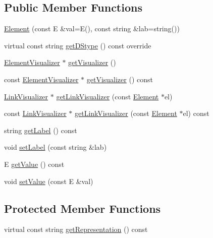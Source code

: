 \subsection*{Public Member Functions}
\begin{DoxyCompactItemize}
\item 
\hyperlink{classbridges_1_1_element_abc7131584142ea48faf3b7a8033d1fef}{Element} (const E \&val=E(), const string \&lab=string())
\item 
virtual const string \hyperlink{classbridges_1_1_element_a9e71af13963e8cc7ec35053797e49155}{get\+D\+Stype} () const  override
\item 
\hyperlink{classbridges_1_1_element_visualizer}{Element\+Visualizer} $\ast$ \hyperlink{classbridges_1_1_element_a358f350ae6e33d55c4ac9f9213d0c5bc}{get\+Visualizer} ()
\item 
const \hyperlink{classbridges_1_1_element_visualizer}{Element\+Visualizer} $\ast$ \hyperlink{classbridges_1_1_element_a7672ce8623ab561d457b4a91e19c4e53}{get\+Visualizer} () const 
\item 
\hyperlink{classbridges_1_1_link_visualizer}{Link\+Visualizer} $\ast$ \hyperlink{classbridges_1_1_element_aa8dd91d04c22c697f7c500a18642282f}{get\+Link\+Visualizer} (const \hyperlink{classbridges_1_1_element}{Element} $\ast$el)
\item 
const \hyperlink{classbridges_1_1_link_visualizer}{Link\+Visualizer} $\ast$ \hyperlink{classbridges_1_1_element_a9cacc23e7eedff13338b8f5180e4b82a}{get\+Link\+Visualizer} (const \hyperlink{classbridges_1_1_element}{Element} $\ast$el) const 
\item 
string \hyperlink{classbridges_1_1_element_aa5e02165249d5d55066132d3128cb6a8}{get\+Label} () const 
\item 
void \hyperlink{classbridges_1_1_element_a22313b74452175d07650168a701daa99}{set\+Label} (const string \&lab)
\item 
E \hyperlink{classbridges_1_1_element_a20290b80dca1c052d9fdb71abf4f0b5e}{get\+Value} () const 
\item 
void \hyperlink{classbridges_1_1_element_a737cb19281b6aa45a5a1dc9d592dad93}{set\+Value} (const E \&val)
\end{DoxyCompactItemize}
\subsection*{Protected Member Functions}
\begin{DoxyCompactItemize}
\item 
virtual const string \hyperlink{classbridges_1_1_element_a4e949dc2eb3c68874104692e086d08c7}{get\+Representation} () const 
\end{DoxyCompactItemize}
